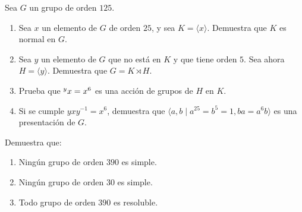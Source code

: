 \documentclass[12pt]{article}
\begin{document}
    \begin{ejercicio}
        Sea $G$ un grupo de orden $125$.
        \begin{enumerate}
            \item Sea $x$ un elemento de $G$ de orden $25$, y sea $K=\langle x\rangle$. Demuestra que $K$ es normal en $G$.
            \item Sea $y$ un elemento de $G$ que no está en $K$ y que tiene orden $5$. Sea ahora $H=\langle y\rangle$. Demuestra que $G=K\rtimes H$.
            \item Prueba que $\prescript{y}{}{x}=x^6$ es una acción de grupos de $H$ en $K$.
            \item Si se cumple $yxy^{-1}=x^6$, demuestra que $\langle a, b\mid a^{25}=b^5=1, ba=a^6b\rangle$ es una presentación de $G$.
        \end{enumerate}
    \end{ejercicio}

    \begin{ejercicio}
        Demuestra que:
        \begin{enumerate}
            \item Ningún grupo de orden $390$ es simple.
            \item Ningún grupo de orden $30$ es simple.
            \item Todo grupo de orden $390$ es resoluble.
        \end{enumerate}
    \end{ejercicio}




    \newpage
    \setcounter{ejercicio}{0}
\end{document}
